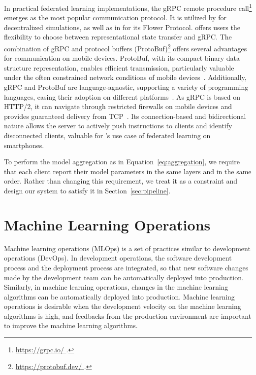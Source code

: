 In practical federated learning implementations,
the gRPC remote procedure call\footnote{\url{
        https://grpc.io/
    }.} emerges as the most popular communication protocol.
It is utilized by \cite{tff,patrick2022openfl} for decentralized simulations,
as well as in \cite{beutel2020flower} for its Flower Protocol.
\cite{madrigal2023project}
offers users the flexibility to choose between representational state transfer
and gRPC. The combination of gRPC and protocol buffers (ProtoBuf)\footnote{\url{
        https://protobuf.dev/
    }.} offers several advantages for communication on mobile devices. ProtoBuf,
with its compact binary data structure representation,
enables efficient transmission,
particularly valuable under the often constrained network conditions of mobile
devices~\cite{popic2016performance}. Additionally,
gRPC and ProtoBuf are language-agnostic,
supporting a variety of programming languages,
easing their adoption on different platforms~\cite{araujo2020performance}.
As gRPC is based on HTTP/2,
it can navigate through restricted firewalls on mobile devices and provides
guaranteed delivery from TCP~\cite{araujo2020performance}.
Its connection-based and bidirectional nature allows the server to actively push
instructions to clients and identify disconnected clients,
valuable for \fedcampus's use case of federated learning on smartphones.

To perform the model aggregation as in Equation~\ref{eq:aggregation},
we require that each client report their model parameters in the same layers and
in the same order. Rather than changing this requirement,
we treat it as a constraint and design our system to satisfy it in
Section~\ref{sec:pipeline}.

\section{Machine Learning Operations}

Machine learning operations (MLOps) is a set of practices similar to
development operations (DevOps).
In development operations,
the software development process and the deployment process are integrated,
so that new software changes made by the development team can be
automatically deployed into production.
Similarly, in machine learning operations,
changes in the machine learning algorithms can be automatically deployed into
production.
Machine learning operations is desirable when the development velocity on
the machine learning algorithms is high,
and feedbacks from the production environment are important to improve
the machine learning algorithms.

